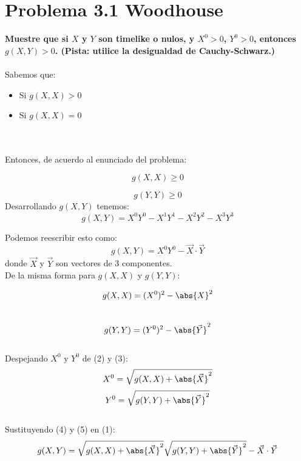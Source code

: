 \documentclass[12pt, A4,spanish,]{report}
\begin{document}
\section*{Problema 3.1 Woodhouse}
\large\justify
\textbf{Muestre que si $X$ y $Y$ son timelike o nulos, y $X^{0}>0$, $Y^{0}>0$, entonces $g(X,Y)>0$. (Pista: utilice la desigualdad de Cauchy-Schwarz.)}
\\
\\
Sabemos que:
\begin{itemize}
    \item Si $g(X,X)>0$
    \item Si $g(X,X)=0$ 
\end{itemize}
\\
\\
Entonces, de acuerdo al enunciado del problema:

    \[g(X,X)\geq0\]

    \[g(Y,Y)\geq0\]
Desarrollando $g(X,Y)$ tenemos:
\[g(X,Y)=X^{0}Y^{0}-X^{1}Y^{1}-X^{2}Y^{2}-X^{3}Y^{3}\]

Podemos reescribir esto como:
\begin{equation}
g(X,Y)=X^{0}Y^{0}-\vec{X}\cdot\vec{Y}     
\end{equation}
donde $\vec{X}$ y $\vec{Y}$ son vectores de 3 componentes.
\\
De la misma forma  para $g(X,X)$ y $g(Y,Y)$:

\begin{equation}
g(X,X)=(X^{0})^2-\abs{X}^2    
\end{equation}
\\

\begin{equation}
g(Y,Y)=(Y^{0})^2-\abs{\vec{Y}}^2    
\end{equation}
\\
Despejando $X^{0}$ y $Y^{0}$ de (2) y (3):
\begin{equation}
 X^{0}=\sqrt{g(X,X)+\abs{\vec{X}}^2}    
\end{equation}
\begin{equation}
 Y^{0}=\sqrt{g(Y,Y)+\abs{\vec{Y}}^2}    
\end{equation}
\\
Sustituyendo (4) y (5) en (1):
\begin{equation}
    g(X,Y)=\sqrt{g(X,X)+\abs{\vec{X}}^2}\sqrt{g(Y,Y)+\abs{\vec{Y}}^2}-\vec{X}\cdot\vec{Y}     
\end{equation}
\end{document}
